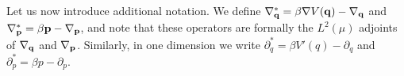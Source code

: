 \documentclass[11pt,a4paper]{article}
\begin{document}

Let us now introduce additional notation.
We define $\nabla_{\boldsymbol{\mathbf q}}^* = \beta \nabla V(\boldsymbol{\mathbf q}) - \nabla_{\boldsymbol{\mathbf q}}$ and $\nabla_{\boldsymbol{\mathbf p}}^* = \beta \boldsymbol{\mathbf p} - \nabla_{\boldsymbol{\mathbf p}}$,
and note that these operators are formally the $L^2(\mu)$ adjoints of $\nabla_{\boldsymbol{\mathbf q}}$ and $\nabla_{\boldsymbol{\mathbf p}}$.
Similarly, in one dimension we write $\partial_q^* = \beta V'(q) - \partial_q$ and $\partial_p^* = \beta p - \partial_p$.
\end{document}
